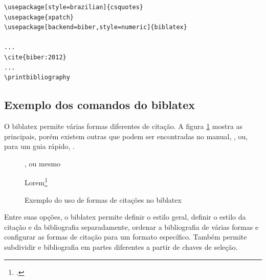 \begin{lstlisting}[caption=Exemplo de uso de biblatex,label=list:bib1]
\usepackage[style=brazilian]{csquotes}
\usepackage{xpatch}
\usepackage[backend=biber,style=numeric]{biblatex}

...
\cite{biber:2012}
...
\printbibliography
\end{lstlisting}



\subsection{Exemplo dos comandos do biblatex}

O biblatex permite várias formas diferentes de citação. A figura \ref{fig:cite} mostra as principais, porém existem outras que podem ser encontradas no manual, \parencite{Kime:2019}, ou, para um guia rápido, \autocite{Rees:2017}.

\begin{figure}[hbt]
\centering
\begin{LTXexample}[pos=b]

\autocite{biber:2012}

\cite{biber:2012}

\parencite{biber:2012}, ou mesmo
 \parencite[veja][12]{biber:2012}

\textcite{biber:2012}

Lorem\footcite{biber:2012}

\end{LTXexample}
\caption{Exemplo do uso de formas de citações no biblatex}
\label{fig:cite}
\end{figure}

Entre suas opções, o biblatex permite definir o estilo geral, definir o estilo da citação e da bibliografia separadamente, ordenar a bibliografia de várias formas e configurar as formas de citação para um formato específico. Também permite subdividir e bibliografia em partes diferentes a partir de chaves de seleção\parencite{Cassidy:2013,Kime:2019}.

